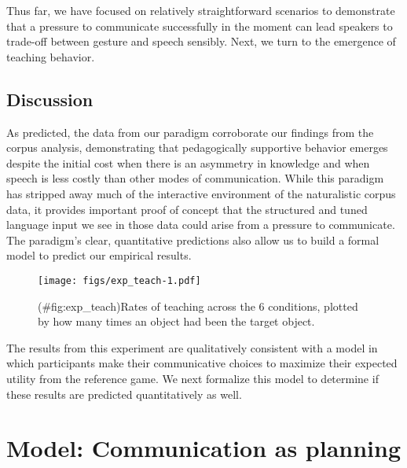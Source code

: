 \documentclass[english,,man,floatsintext]{apa6}
\begin{document}
Thus far, we have focused on relatively straightforward scenarios to demonstrate that a pressure to communicate successfully in the moment can lead speakers to trade-off between gesture and speech sensibly. Next, we turn to the emergence of teaching behavior.

\hypertarget{discussion-1}{%
\subsection{Discussion}\label{discussion-1}}

As predicted, the data from our paradigm corroborate our findings from the corpus analysis, demonstrating that pedagogically supportive behavior emerges despite the initial cost when there is an asymmetry in knowledge and when speech is less costly than other modes of communication. While this paradigm has stripped away much of the interactive environment of the naturalistic corpus data, it provides important proof of concept that the structured and tuned language input we see in those data could arise from a pressure to communicate. The paradigm's clear, quantitative predictions also allow us to build a formal model to predict our empirical results.

\begin{figure}
\centering
\texttt{[image: figs/exp\_teach-1.pdf]}
\caption{(\#fig:exp\_teach)Rates of teaching across the 6 conditions, plotted by how many times an object had been the target object.}
\end{figure}

The results from this experiment are qualitatively consistent with a model in which participants make their communicative choices to maximize their expected utility from the reference game. We next formalize this model to determine if these results are predicted quantitatively as well.

\newcommand{\E}[1]{\mathbb{E}\left[ #1 \right]}

\hypertarget{model-communication-as-planning}{%
\section{Model: Communication as planning}\label{model-communication-as-planning}}
\end{document}
